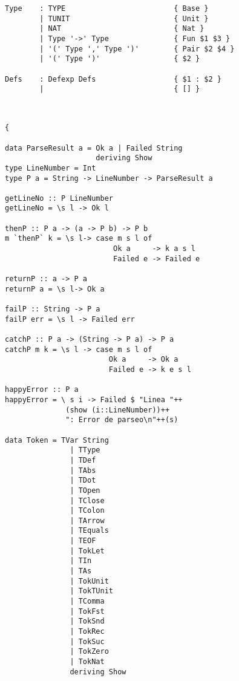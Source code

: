 \documentclass[a4paper]{article}
\begin{document}
\begin{lstlisting}
Type    : TYPE                         { Base }
        | TUNIT                        { Unit }
        | NAT                          { Nat }
        | Type '->' Type               { Fun $1 $3 }
        | '(' Type ',' Type ')'        { Pair $2 $4 }
        | '(' Type ')'                 { $2 }

Defs    : Defexp Defs                  { $1 : $2 }
        |                              { [] }

\end{lstlisting}
\begin{lstlisting}


{

data ParseResult a = Ok a | Failed String
                     deriving Show                     
type LineNumber = Int
type P a = String -> LineNumber -> ParseResult a

getLineNo :: P LineNumber
getLineNo = \s l -> Ok l

thenP :: P a -> (a -> P b) -> P b
m `thenP` k = \s l-> case m s l of
                         Ok a     -> k a s l
                         Failed e -> Failed e
                         
returnP :: a -> P a
returnP a = \s l-> Ok a

failP :: String -> P a
failP err = \s l -> Failed err

catchP :: P a -> (String -> P a) -> P a
catchP m k = \s l -> case m s l of
                        Ok a     -> Ok a
                        Failed e -> k e s l

happyError :: P a
happyError = \ s i -> Failed $ "Linea "++
              (show (i::LineNumber))++
              ": Error de parseo\n"++(s)

data Token = TVar String
               | TType
               | TDef
               | TAbs
               | TDot
               | TOpen
               | TClose 
               | TColon
               | TArrow
               | TEquals
               | TEOF
               | TokLet
               | TIn
               | TAs
               | TokUnit
               | TokTUnit
               | TComma
               | TokFst
               | TokSnd
               | TokRec
               | TokSuc
               | TokZero
               | TokNat
               deriving Show

\end{lstlisting}
\pagebreak
\end{document}
